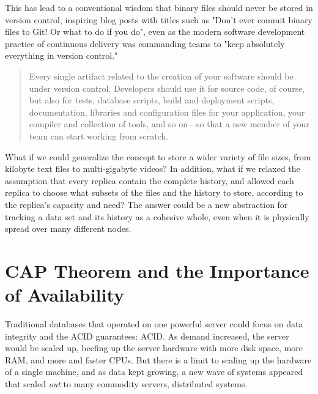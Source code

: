 This has lead to a conventional wisdom that binary files should never be stored
in version control, inspiring blog posts with titles such as "Don't ever commit
binary files to Git! Or what to do if you
do"\cite{dont_ever_commit_binaries_to_version_control}, even as the modern
software development practice of continuous delivery was commanding teams to
"keep absolutely everything in version
control."\cite[p.33]{continuousdeliverybook}

\blockcquote[p.33]{continuousdeliverybook}{
    Every single artifact related to the creation of your software should be
    under version control. Developers should use it for source code, of course,
    but also for tests, database scripts, build and deployment scripts,
    documentation, libraries and configuration files for your application, your
    compiler and collection of tools, and so on---so that a new member of your
    team can start working from scratch.
}

What if we could generalize the 
concept to store a wider variety of file sizes, from kilobyte text files to
multi-gigabyte videos? In addition, what if we relaxed the assumption that every
replica contain the complete history, and allowed each replica to choose what
subsets of the files and the history to store, according to the replica's
capacity and need? The answer could be a new abstraction for tracking a data set
and its history as a cohesive whole, even when it is physically spread over many
different nodes.

%



\section{CAP Theorem and the Importance of Availability}


Traditional databases that operated on one powerful server could focus on data
integrity and the \acrshort{ACID} guarantees: \acrlong{ACID}\cite[Chapter
1]{nosqldistilled}. As demand increased, the server would be scaled up, beefing
up the server hardware with more disk space, more RAM, and more and faster
CPUs\cite[Chapter 4]{nosqldistilled}. But there is a limit to scaling up the
hardware of a single machine, and as data kept growing, a new wave of systems
appeared that scaled \emph{out} to many commodity servers, distributed
systems\cite[Chapter 4]{nosqldistilled}.

